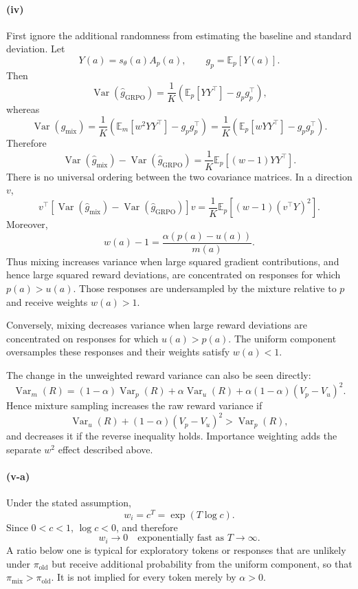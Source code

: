 \documentclass[11pt]{article}
\begin{document}
\paragraph{(iv)}
First ignore the additional randomness from estimating the baseline and
standard deviation. Let
\[
Y(a)=s_\theta(a)A_p(a),
\qquad
g_p=\mathbb{E}_{p}[Y(a)].
\]
Then
\[
\operatorname{Var}(\hat g_{\mathrm{GRPO}})
=
\frac{1}{K}
\left(
\mathbb{E}_{p}[YY^\top]-g_pg_p^\top
\right),
\]
whereas
\[
\operatorname{Var}(\hat g_{\mathrm{mix}})
=
\frac{1}{K}
\left(
\mathbb{E}_{m}[w^2YY^\top]-g_pg_p^\top
\right)
=
\frac{1}{K}
\left(
\mathbb{E}_{p}[wYY^\top]-g_pg_p^\top
\right).
\]
Therefore
\[
\boxed{
\operatorname{Var}(\hat g_{\mathrm{mix}})
-
\operatorname{Var}(\hat g_{\mathrm{GRPO}})
=
\frac{1}{K}
\mathbb{E}_{p}
\left[
(w-1)YY^\top
\right].
}
\]
There is no universal ordering between the two covariance matrices. In a
direction $v$,
\[
v^\top
\left[
\operatorname{Var}(\hat g_{\mathrm{mix}})
-
\operatorname{Var}(\hat g_{\mathrm{GRPO}})
\right]v
=
\frac{1}{K}
\mathbb{E}_{p}
\left[
(w-1)(v^\top Y)^2
\right].
\]
Moreover,
\[
w(a)-1
=
\frac{\alpha(p(a)-u(a))}{m(a)}.
\]
Thus mixing increases variance when large squared gradient contributions,
and hence large squared reward deviations, are concentrated on responses for
which $p(a)>u(a)$. Those responses are undersampled by the mixture relative to
$p$ and receive weights $w(a)>1$.

Conversely, mixing decreases variance when large reward deviations are
concentrated on responses for which $u(a)>p(a)$. The uniform component
oversamples these responses and their weights satisfy $w(a)<1$.

The change in the unweighted reward variance can also be seen directly:
\[
\operatorname{Var}_{m}(R)
=
(1-\alpha)\operatorname{Var}_{p}(R)
+
\alpha\operatorname{Var}_{u}(R)
+
\alpha(1-\alpha)(V_p-V_u)^2.
\]
Hence mixture sampling increases the raw reward variance if
\[
\operatorname{Var}_{u}(R)
+
(1-\alpha)(V_p-V_u)^2
>
\operatorname{Var}_{p}(R),
\]
and decreases it if the reverse inequality holds. Importance weighting adds
the separate $w^2$ effect described above.

\paragraph{(v-a)}
Under the stated assumption,
\[
w_i=c^T=\exp(T\log c).
\]
Since $0<c<1$, $\log c<0$, and therefore
\[
\boxed{
w_i\to0
\quad\text{exponentially fast as }T\to\infty.
}
\]
A ratio below one is typical for exploratory tokens or responses that are
unlikely under $\pi_{\mathrm{old}}$ but receive additional probability from
the uniform component, so that
$\pi_{\mathrm{mix}}>\pi_{\mathrm{old}}$. It is not implied for every token
merely by $\alpha>0$.
\end{document}
